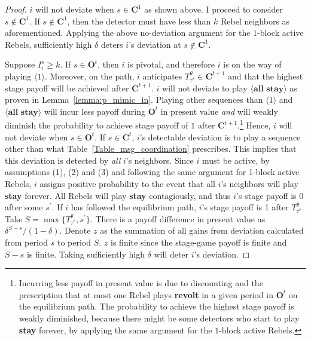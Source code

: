 \documentclass[12pt,letter]{article}
\newcommand{\Kappa}{\mathbf{C}}
\newcommand{\Omicron}{\mathbf{O}}
\theoremstyle{definition}
\theoremstyle{remark}
\theoremstyle{claim}
\begin{document}
\begin{proof}
$i$ will not deviate when $s\in \Kappa^1$ as shown above. I proceed to consider $s\not\in \Kappa^1$. If $s\not\in \Kappa^1$, then the detector must have less than $k$ Rebel neighbors as aforementioned. Applying the above no-deviation argument for the $1$-block active Rebels, sufficiently high $\delta$ deters $i$'s deviation at $s\not\in \Kappa^1$.

Suppose $I^s_i\geq k$. If $s\in\Omicron^{t}$, then $i$ is pivotal, and therefore $i$ is on the way of playing $\langle 1 \rangle$. Moreover, on the path, $i$ anticipates $T^{\theta}_{\tau^{*}}\in \Kappa^{t+1}$ and that the highest stage payoff will be achieved after $\Kappa^{t+1}$. $i$ will not deviate to play $\langle \textbf{all stay} \rangle$ as proven in Lemma~\ref{lemma:p_mimic_in}. Playing other sequences than $\langle 1 \rangle$ and $\langle \textbf{all stay} \rangle $ will incur less payoff during $\Omicron^{t}$ in present value \textit{and} will weakly diminish the probability to achieve stage payoff of $1$ after $\Kappa^{t+1}$.\footnote{Incurring less payoff in present value is due to discounting and the prescription that at most one Rebel plays \textbf{revolt} in a given period in $\Omicron^t$ on the equilibrium path. The probability to achieve the highest stage payoff is weakly diminished, because there might be some detectors who start to play \textbf{stay} forever, by applying the same argument for the $1$-block active Rebels.} 
Hence, $i$ will not deviate when $s\in \Omicron^{t}$. If $s\in\Kappa^{t}$, $i$'s detectable deviation is to play a sequence other than what Table~\ref{Table_msg_coordination} prescribes. This implies that this deviation is detected by \textit{all} $i$'s neighbors. Since $i$ must be active, by assumptions (1), (2) and (3) and following the same argument for 1-block active Rebels, $i$ assigns positive probability to the event that all $i$'s neighbors will play \textbf{stay} forever. All Rebels will play \textbf{stay} contagiously, and thus $i$'s stage payoff is 0 after some $s^{'}$. If $i$ has followed the equilibrium path, $i$'s stage payoff is 1 after $T^{\theta}_{\tau^{*}}$. Take $S=\max\{T^{\theta}_{\tau^{*}},s^{'}\}$. There is a payoff difference in present value as $\delta^{S-s}/(1-\delta)$. Denote $z$ as the summation of all gains from deviation calculated from period $s$ to period $S$. $z$ is finite since the stage-game payoff is finite and $S-s$ is finite. Taking sufficiently high $\delta$ will deter $i$'s deviation.


%
%

\end{proof}
\end{document}
